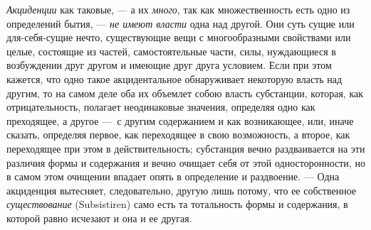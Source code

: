 {\em Акциденции} как таковые, — а их
{\em много}, так как множественность есть одно из
определений бытия, — {\em не имеют власти} одна над
другой. Они суть сущие или для-себя-сущие нечто, существующие вещи с
многообразными свойствами или целые, состоящие из частей, самостоятельные
части, силы, нуждающиеся в возбуждении друг другом и имеющие друг друга
условием. Если при этом кажется, что одно такое акцидентальное обнаруживает
некоторую власть над другим, то на самом деле оба их объемлет собою власть
субстанции, которая, как отрицательность, полагает неодинаковые значения,
определяя одно как преходящее, а другое —~с другим содержанием и как
возникающее, или, иначе сказать, определяя первое, как переходящее в свою
возможность, а второе, как переходящее при этом в действительность;
субстанция вечно раздваивается на эти различия формы и содержания и вечно
очищает себя от этой односторонности, но в самом этом очищении впадает
опять в определение и раздвоение. — Одна акциденция вытесняет,
следовательно, другую лишь потому, что ее собственное
{\em существование} (Subsistiren) само есть та
тотальность формы и содержания, в которой равно исчезают и она и ее другая.

